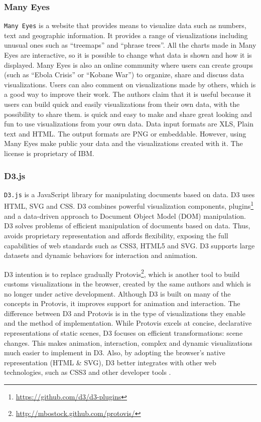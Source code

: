 \subsubsection{Many Eyes}
\label{sec:manyEyes}
\texttt{Many Eyes} \cite{ibm2010} is a website that provides means to visualize data such as numbers, text and geographic information. It provides a range of visualizations including unusual ones such as ``treemaps''  and ``phrase trees''. All the charts made in Many Eyes are interactive, so it is possible to change what data is shown and how it is displayed. Many Eyes is also an online community where users can create groups (such as ``Ebola Crisis'' or ``Kobane War'') to organize, share and discuss data visualizations. Users can also comment on visualizations made by others, which is a good way to improve their work. The authors claim that it is useful because it users can build quick and easily visualizations from their own data, with the possibility to share them. is quick and easy to make and share great looking and fun to use visualizations from your own data. Data input formats are XLS, Plain text and HTML. The output formats are PNG or embeddable. However, using Many Eyes make public your data and the visualizations created with it. The license is proprietary of IBM. 

\subsubsection{D3.js}
\label{sec:d3js}

\texttt{D3.js} \cite{d3js} is a JavaScript library for manipulating documents based on data. D3 uses HTML, SVG and CSS. D3 combines powerful visualization components, plugins\footnote{\url{https://github.com/d3/d3-plugins}}  and a data-driven approach to Document Object Model (DOM) manipulation. D3 solves problems of efficient manipulation of documents based on data. Thus, avoids proprietary representation and affords flexibility, exposing the full capabilities of web standards such as CSS3, HTML5 and SVG. D3 supports large datasets and dynamic behaviors for interaction and animation.
  
D3 intention is to replace gradually Protovis\footnote{\url{http://mbostock.github.com/protovis/}}, which is another tool to build customs visualizations in the browser, created by the same authors and which is no longer under active development. Although D3 is built on many of the concepts in Protovis, it improves support for animation and interaction. The difference between D3 and Protovis  is in the type of visualizations they enable and the method of implementation. While Protovis excels at concise, declarative representations of static scenes, D3 focuses on efficient transformations: scene changes. This makes animation, interaction, complex and dynamic visualizations much easier to implement in D3. Also, by adopting the browser's native representation (HTML \& SVG), D3 better integrates with other web technologies, such as CSS3 and other developer tools .

